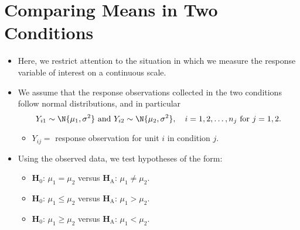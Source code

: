\section{Comparing Means in Two Conditions}
\begin{itemize}
      \item Here, we restrict attention to the situation in which we measure the response variable
            of interest on a continuous scale.
      \item We assume that the response observations collected in the two conditions follow normal
            distributions, and in particular
            \[ Y_{i1}\sim \N{\mu_1,\sigma^2}\text{ and }Y_{i2} \sim \N{\mu_2,\sigma^2},\quad i=1,2,\ldots,n_j\text{ for } j=1,2. \]
            \begin{itemize}
                  \item $ Y_{ij}= $ response observation for unit $ i $ in condition $ j $.
            \end{itemize}
      \item Using the observed data, we test hypotheses of the form:
            \begin{itemize}
                  \item $ \mathbf{H}_0 $: $ \mu_1=\mu_2 $ versus $ \mathbf{H}_\text{A} $: $ \mu_1\ne\mu_2 $.
                  \item $ \mathbf{H}_0 $: $ \mu_1\le\mu_2 $ versus $ \mathbf{H}_\text{A} $: $ \mu_1>\mu_2 $.
                  \item $ \mathbf{H}_0 $: $ \mu_1\ge\mu_2 $ versus $ \mathbf{H}_\text{A} $: $ \mu_1<\mu_2 $.
            \end{itemize}
\end{itemize}
